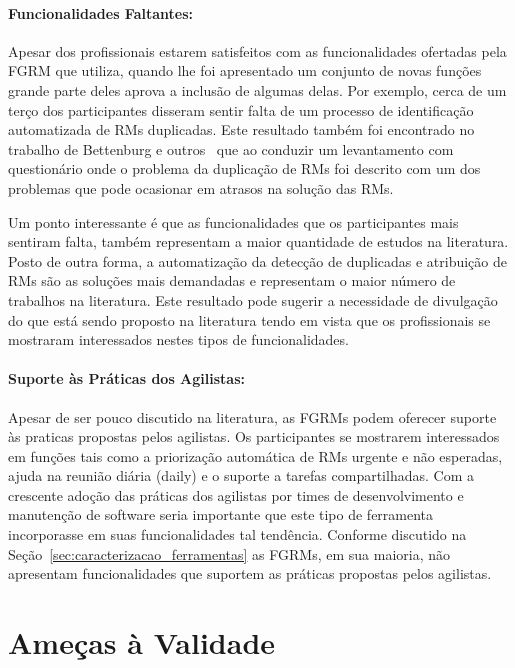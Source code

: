 \paragraph{Funcionalidades Faltantes:}
\label{par:pesq_profissionais_funcionalidades_faltantes}

Apesar dos profissionais estarem satisfeitos com as funcionalidades ofertadas
pela FGRM que utiliza, quando lhe foi apresentado um conjunto de novas funções
grande parte deles aprova a inclusão de algumas delas. Por exemplo, cerca de um
terço dos participantes disseram sentir falta de um processo de identificação
automatizada de RMs duplicadas. Este resultado também foi encontrado no trabalho
de Bettenburg e outros~\cite{bettenburg2008makes} que ao conduzir um
levantamento com questionário onde o problema da duplicação de RMs foi descrito
com um dos problemas que pode ocasionar em atrasos na solução das RMs.

Um ponto interessante é que as funcionalidades que os participantes mais
sentiram falta, também representam a maior quantidade de estudos na literatura.
Posto de outra forma, a automatização da detecção de duplicadas e atribuição de
RMs são as soluções mais demandadas e representam o maior número de trabalhos na
literatura. Este resultado pode sugerir a necessidade de divulgação do que está
sendo proposto na literatura tendo em vista que os profissionais se mostraram
interessados nestes tipos de funcionalidades.

\paragraph{Suporte às Práticas dos Agilistas:}
\label{par:pesq_profissionais_suporte_pratica_agilistas}

Apesar de ser pouco discutido na literatura, as FGRMs podem oferecer suporte às
praticas propostas pelos agilistas. Os participantes se mostrarem interessados
em funções tais como a priorização automática de RMs urgente e não esperadas,
ajuda na reunião diária (daily) e o suporte a tarefas compartilhadas. Com a
crescente adoção das práticas dos agilistas por times de desenvolvimento e
manutenção de software seria importante que este tipo de ferramenta incorporasse
em suas funcionalidades tal tendência. Conforme discutido na
Seção~\ref{sec:caracterizacao_ferramentas} as FGRMs, em sua maioria, não
apresentam funcionalidades que suportem as práticas propostas pelos agilistas.

\section{Ameças à Validade}
\label{sec:pesquisa_profissionais_ameacas_validade}

